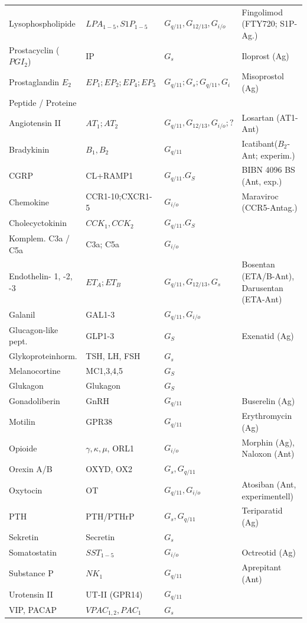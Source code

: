 \documentclass[10pt,a4paper]{report}
\begin{document}
\begin{table}
\begin{longtable}{p{3cm}p{3cm}lp{6cm}}
		Lysophospholipide&$LPA_{1-5}, S1P_{1-5}$&$G_{q/11},G_{12/13}, G_{i/o}$&Fingolimod (FTY720; S1P-Ag.)\\
		Prostacyclin ($PGI_2$)&IP&$G_s$&Iloprost (Ag)\\
		Prostaglandin $E_2$&$EP_1; EP_2; EP_4; EP_3$&$G_{q/11}; G_s; G_{q/11}, G_i$&Misoprostol (Ag)\\
		\addlinespace
		Peptide / Proteine&&&\\
		\midrule
		Angiotensin II&$AT_1; AT_2$&$G_{q/11}, G_{12/13}, G_{i/o}; ?$&Losartan (AT1-Ant)\\
		Bradykinin&$B_1, B_2$&$G_{q/11}$&Icatibant($B_2$-Ant; experim.)\\
		CGRP&CL+RAMP1&$G_{q/11}. G_S$&BIBN 4096 BS (Ant, exp.)\\
		Chemokine&CCR1-10;CXCR1-5&$G_{i/o}$&Maraviroc (CCR5-Antag.)\\
		Cholecyctokinin&$CCK_1, CCK_2$&$G_{q/11}. G_S$&\\
		Komplem. C3a / C5a&C3a; C5a&$G_{i/o}$&\\
		Endothelin- 1, -2, -3&$ET_A; ET_B$&$G_{q/11}, G_{12/13}, G_s$&Bosentan (ETA/B-Ant), Darusentan (ETA-Ant)\\
		Galanil&GAL1-3&$G_{q/11}, G_{i/o}$&\\
		Glucagon-like pept.&GLP1-3&$G_S$&Exenatid (Ag)\\
		Glykoproteinhorm.&TSH, LH, FSH&$G_s$&\\
		Melanocortine&MC1,3,4,5&$G_S$&\\
		Glukagon&Glukagon&$G_S$&\\
		Gonadoliberin&GnRH&$G_{q/11}$&Buserelin (Ag)\\
		Motilin&GPR38&$G_{q/11}$&Erythromycin (Ag)\\
		Opioide&$\gamma, \kappa, \mu$, ORL1&$G_{i/o}$&Morphin (Ag), Naloxon (Ant)\\
		Orexin A/B&OXYD, OX2&$G_s, G_{q/11}$&\\
		Oxytocin&OT&$G_{q/11}, G_{i/o}$&Atosiban (Ant, experimentell)\\
		PTH&PTH/PTHrP&$G_s, G_{q/11}$&Teriparatid (Ag)\\
		Sekretin&Secretin&$G_s$&\\
		Somatostatin&$SST_{1-5}$&$G_{i/o}$&Octreotid (Ag)\\
		Substance P&$NK_1$&$G_{q/11}$&Aprepitant (Ant)\\
		Urotensin II&UT-II (GPR14)&$G_{q/11}$&\\
		VIP, PACAP&$VPAC_{1,2}, PAC_1$&$G_s$&\\

\end{longtable}
\end{table}
\end{document}
